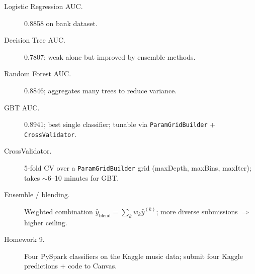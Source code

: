 \documentclass[11pt]{article}
\begin{document}
\begin{description}
    \item[Logistic Regression AUC.] 0.8858 on bank dataset.
    \item[Decision Tree AUC.] 0.7807; weak alone but improved by ensemble methods.
    \item[Random Forest AUC.] 0.8846; aggregates many trees to reduce variance.
    \item[GBT AUC.] 0.8941; best single classifier; tunable via \texttt{ParamGridBuilder} + \texttt{CrossValidator}.
    \item[CrossValidator.] 5-fold CV over a \texttt{ParamGridBuilder} grid (maxDepth, maxBins, maxIter); takes $\sim$6--10 minutes for GBT.
    \item[Ensemble / blending.] Weighted combination $\hat{y}_{\text{blend}} = \sum_k w_k \hat{y}^{(k)}$; more diverse submissions $\Rightarrow$ higher ceiling.
    \item[Homework 9.] Four PySpark classifiers on the Kaggle music data; submit four Kaggle predictions + code to Canvas.
\end{description}
\end{document}
